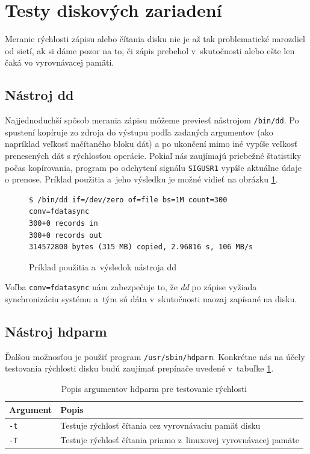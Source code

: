 \section{Testy diskových zariadení}

Meranie rýchlosti zápisu alebo čítania disku nie je až tak problematické
narozdiel od sietí, ak si dáme pozor na to, či zápis prebehol v~skutočnosti
alebo ešte len čaká vo vyrovnávacej pamäti.

%
%

\subsection*{Nástroj dd}

Najjednoduchší spôsob merania zápisu môžeme previesť nástrojom
\texttt{/bin/dd}. Po spustení kopíruje zo zdroja do výstupu podľa zadaných
argumentov (ako napríklad veľkosť načítaného bloku dát) a po ukončení mimo iné
vypíše veľkosť prenesených dát s rýchlosťou operácie. Pokiaľ nás zaujímajú
priebežné štatistiky počas kopírovania, program po odchytení signálu
\texttt{SIGUSR1} vypíše aktuálne údaje o prenose.  Príklad použitia a~jeho
výsledku je možné vidieť na obrázku \ref{alg:dd-usage}.

\begin{figure}[H]
\begin{lstlisting}
$ /bin/dd if=/dev/zero of=file bs=1M count=300 conv=fdatasync
300+0 records in
300+0 records out
314572800 bytes (315 MB) copied, 2.96816 s, 106 MB/s
\end{lstlisting}
\caption{Príklad použitia a~výsledok nástroja dd}
\label{alg:dd-usage}
\end{figure}

Voľba \texttt{conv=fdatasync} nám zabezpečuje to, že \emph{dd} po zápise
vyžiada synchronizáciu systému a~tým sú dáta v~skutočnosti naozaj zapísané na
disku.

%
%

\subsection*{Nástroj hdparm}

Ďalšou možnosťou je použiť program \texttt{/usr/sbin/hdparm}. Konkrétne nás na účely testovania rýchlosti disku budú zaujímať prepínače uvedené v~tabuľke \ref{tab:hdparm-args}.

\begin{table}[H]
\begin{center}
\begin{tabular}{|l|l|}
    \hline
    \textbf{Argument} & \textbf{Popis} \\
    \hline
    \texttt{-t}  & Testuje rýchlosť čítania cez vyrovnávaciu pamäť disku \\
    \texttt{-T}  & Testuje rýchlosť čítania priamo z~linuxovej vyrovnávacej pamäte \\
    \hline
\end{tabular}
\caption{Popis argumentov hdparm pre testovanie rýchlosti}
\label{tab:hdparm-args}
\end{center}
\end{table}

